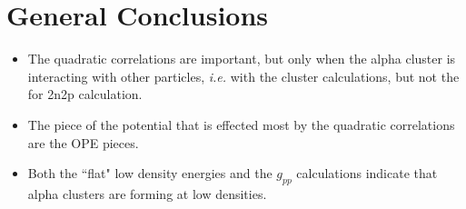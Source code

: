 \documentclass[12pt]{article}
\begin{document}
\newpage
\section*{General Conclusions}
\begin{itemize}
   \item The quadratic correlations are important, but only when the alpha cluster is interacting with other particles, {\it i.e.} with the cluster calculations, but not the for 2n2p calculation.
   \item The piece of the potential that is effected most by the quadratic correlations are the OPE pieces.
   \item Both the ``flat" low density energies and the $g_{pp}$ calculations indicate that alpha clusters are forming at low densities.
\end{itemize}
\end{document}
